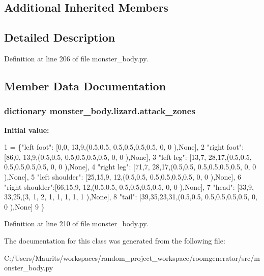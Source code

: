\subsection*{Additional Inherited Members}


\subsection{Detailed Description}


Definition at line 206 of file monster\+\_\+body.\+py.



\subsection{Member Data Documentation}
\hypertarget{classmonster__body_1_1lizard_a5a110c2e0fc9241d947825096ded2d92}{}
\subsubsection[{attack\+\_\+zones}]{\setlength{\rightskip}{0pt plus 5cm}dictionary monster\+\_\+body.\+lizard.\+attack\+\_\+zones\hspace{0.3cm}{\ttfamily [static]}}\label{classmonster__body_1_1lizard_a5a110c2e0fc9241d947825096ded2d92}
{\bfseries Initial value\+:}
\begin{DoxyCode}
1 = \{\textcolor{stringliteral}{"left foot"}:     [0,0,  13,9,(0.5,0.5, 0.5,0.5,0.5,0.5,  0,  0  ),\textcolor{keywordtype}{None}],
2                   \textcolor{stringliteral}{"right foot"}:    [86,0, 13,9,(0.5,0.5, 0.5,0.5,0.5,0.5,  0,  0  ),\textcolor{keywordtype}{None}],
3                   \textcolor{stringliteral}{"left leg"}:      [13,7, 28,17,(0.5,0.5, 0.5,0.5,0.5,0.5,  0,  0 ),\textcolor{keywordtype}{None}],
4                   \textcolor{stringliteral}{"right leg"}:     [71,7, 28,17,(0.5,0.5, 0.5,0.5,0.5,0.5,  0,  0 ),\textcolor{keywordtype}{None}],
5                   \textcolor{stringliteral}{"left shoulder"}: [25,15,9, 12,(0.5,0.5, 0.5,0.5,0.5,0.5,  0,  0 ),\textcolor{keywordtype}{None}],
6                   \textcolor{stringliteral}{"right shoulder"}:[66,15,9, 12,(0.5,0.5, 0.5,0.5,0.5,0.5,  0,  0 ),\textcolor{keywordtype}{None}],
7                   \textcolor{stringliteral}{"head"}:          [33,9, 33,25,(3,  1,   2,  1,  1,  1,    1,  1 ),\textcolor{keywordtype}{None}],
8                   \textcolor{stringliteral}{"tail"}:          [39,35,23,31,(0.5,0.5, 0.5,0.5,0.5,0.5,  0,  0 ),\textcolor{keywordtype}{None}]
9                   \}
\end{DoxyCode}


Definition at line 210 of file monster\+\_\+body.\+py.



The documentation for this class was generated from the following file\+:\begin{DoxyCompactItemize}
\item 
C\+:/\+Users/\+Maurits/workspaces/random\+\_\+project\+\_\+workspace/roomgenerator/src/monster\+\_\+body.\+py\end{DoxyCompactItemize}
